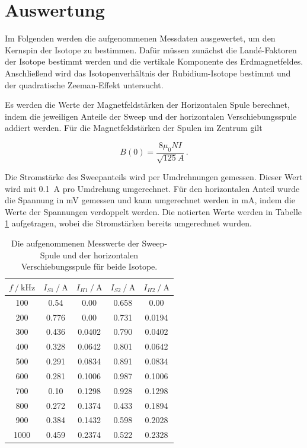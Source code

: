 \section{Auswertung}
\label{sec:auswertung}

Im Folgenden werden die aufgenommenen Messdaten ausgewertet, um den Kernspin der Isotope zu bestimmen.
Dafür müssen zunächst die Landé-Faktoren der Isotope bestimmt werden und die vertikale Komponente des Erdmagnetfeldes.
Anschließend wird das Isotopenverhältnis der Rubidium-Isotope bestimmt und der quadratische Zeeman-Effekt untersucht.

Es werden die Werte der Magnetfeldstärken der Horizontalen Spule berechnet, indem die jeweiligen Anteile der Sweep und der
horizontalen Verschiebungsspule addiert werden.
Für die Magnetfeldstärken der Spulen im Zentrum gilt

\begin{equation}
    B(0) = \frac{8  \mu_0  N I}{\sqrt{125} A}  \, .
    \label{eqn:magnetfeld}
\end{equation}

Die Stromstärke des Sweepanteils wird per Umdrehnungen gemessen.
Dieser Wert wird mit \qty{0.1}{\ampere} pro Umdrehung umgerechnet.
Für den horizontalen Anteil wurde die Spannung in \unit{\milli\volt} gemessen und kann umgerechnet werden in \unit{\milli\ampere},
indem die Werte der Spannungen verdoppelt werden.
Die notierten Werte werden in Tabelle \ref{tab:magnetfeldstärken} aufgetragen, wobei die Stromstärken bereits umgerechnet wurden.

\begin{table}
    \centering
    \caption{Die aufgenommenen Messwerte der Sweep-Spule und der horizontalen Verschiebungsspule für beide Isotope.}
    \label{tab:magnetfeldstärken}
    \begin{tabular}{c c c c c}
        \toprule
        $f \mathbin{/} \mathrm{kHz} $& $I_{S1} \mathbin{/} \unit{\ampere}$ & $I_{H1} \mathbin{/} \unit{\ampere}$ & $I_{S2} \mathbin{/} \unit{\ampere}$ & $I_{H2} \mathbin{/} \unit{\ampere}$ \\
        \midrule
        100 & 0.54 & 0.00 & 0.658 & 0.00 \\
        200 & 0.776 & 0.00 & 0.731 & 0.0194 \\
        300 & 0.436 & 0.0402 & 0.790 & 0.0402 \\
        400 & 0.328 & 0.0642 & 0.801 & 0.0642 \\
        500 & 0.291 & 0.0834 & 0.891 & 0.0834 \\
        600 & 0.281 & 0.1006 & 0.987 & 0.1006 \\
        700 & 0.10 & 0.1298 & 0.928 & 0.1298 \\
        800 & 0.272 & 0.1374 & 0.433 & 0.1894 \\
        900 & 0.384 & 0.1432 & 0.598 & 0.2028 \\
        1000 & 0.459 & 0.2374 & 0.522 & 0.2328 \\
        \bottomrule
    \end{tabular}
\end{table}

